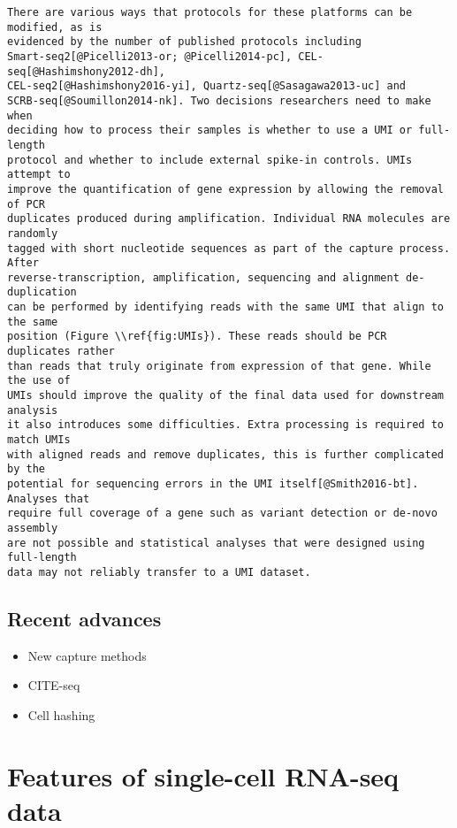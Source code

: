 \documentclass[11pt,a4paper,titlepage,twoside,openright]{style/unimelbthesis}
\theoremstyle{definition}
\theoremstyle{definition}
\theoremstyle{definition}
\theoremstyle{remark}
\begin{document}
\begin{mainmatter}
\begin{verbatim}
There are various ways that protocols for these platforms can be modified, as is
evidenced by the number of published protocols including
Smart-seq2[@Picelli2013-or; @Picelli2014-pc], CEL-seq[@Hashimshony2012-dh],
CEL-seq2[@Hashimshony2016-yi], Quartz-seq[@Sasagawa2013-uc] and
SCRB-seq[@Soumillon2014-nk]. Two decisions researchers need to make when
deciding how to process their samples is whether to use a UMI or full-length
protocol and whether to include external spike-in controls. UMIs attempt to
improve the quantification of gene expression by allowing the removal of PCR
duplicates produced during amplification. Individual RNA molecules are randomly
tagged with short nucleotide sequences as part of the capture process. After
reverse-transcription, amplification, sequencing and alignment de-duplication
can be performed by identifying reads with the same UMI that align to the same
position (Figure \\ref{fig:UMIs}). These reads should be PCR duplicates rather
than reads that truly originate from expression of that gene. While the use of
UMIs should improve the quality of the final data used for downstream analysis
it also introduces some difficulties. Extra processing is required to match UMIs
with aligned reads and remove duplicates, this is further complicated by the
potential for sequencing errors in the UMI itself[@Smith2016-bt]. Analyses that
require full coverage of a gene such as variant detection or de-novo assembly
are not possible and statistical analyses that were designed using full-length
data may not reliably transfer to a UMI dataset.
\end{verbatim}

\hypertarget{recent-advances}{%
\subsection{Recent advances}\label{recent-advances}}

\begin{itemize}
\tightlist
\item
  New capture methods
\item
  CITE-seq
\item
  Cell hashing
\end{itemize}

\hypertarget{features-of-single-cell-rna-seq-data}{%
\section{Features of single-cell RNA-seq data}\label{features-of-single-cell-rna-seq-data}}


\end{mainmatter}
\end{document}
